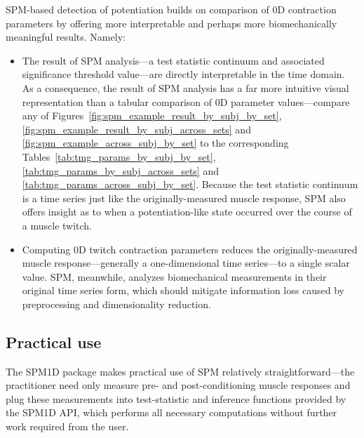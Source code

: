 \documentclass[utf8]{FrontiersinHarvard}
\begin{document}
SPM-based detection of potentiation builds on comparison of 0D contraction parameters by offering more interpretable and perhaps more biomechanically meaningful results.
Namely:
\begin{itemize}

    \item The result of SPM analysis---a test statistic continuum and associated significance threshold value---are directly interpretable in the time domain.
    As a consequence, the result of SPM analysis has a far more intuitive visual representation than a tabular comparison of 0D parameter values---compare any of Figures~\ref{fig:spm_example_result_by_subj_by_set}, \ref{fig:spm_example_result_by_subj_across_sets} and \ref{fig:spm_example_across_subj_by_set} to the corresponding Tables~\ref{tab:tmg_params_by_subj_by_set}, \ref{tab:tmg_params_by_subj_across_sets} and \ref{tab:tmg_params_across_subj_by_set}.
    Because the test statistic continuum is a time series just like the originally-measured muscle response, SPM also offers insight as to when a potentiation-like state occurred over the course of a muscle twitch.

    \item Computing 0D twitch contraction parameters reduces the originally-measured muscle response---generally a one-dimensional time series---to a single scalar value. 
    SPM, meanwhile, analyzes biomechanical measurements in their original time series form, which should mitigate information loss caused by preprocessing and dimensionality reduction.

\end{itemize}

\subsection{Practical use}
The SPM1D package \citep{pataky-spm1d} makes practical use of SPM relatively straightforward---the practitioner need only measure pre- and post-conditioning muscle responses and plug these measurements into test-statistic and inference functions provided by the SPM1D API, which performs all necessary computations without further work required from the user.
\end{document}
